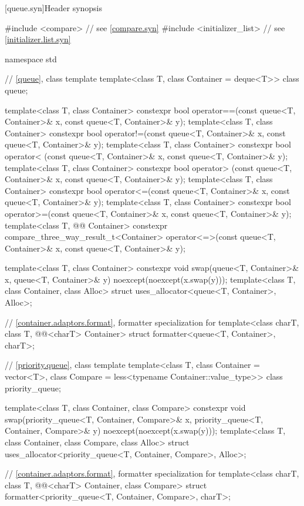 [queue.syn]{Header  synopsis}

\begin{codeblock}
#include <compare>              // see \ref{compare.syn}
#include <initializer_list>     // see \ref{initializer.list.syn}

namespace std {
  // \ref{queue}, class template 
  template<class T, class Container = deque<T>> class queue;

  template<class T, class Container>
    constexpr bool operator==(const queue<T, Container>& x, const queue<T, Container>& y);
  template<class T, class Container>
    constexpr bool operator!=(const queue<T, Container>& x, const queue<T, Container>& y);
  template<class T, class Container>
    constexpr bool operator< (const queue<T, Container>& x, const queue<T, Container>& y);
  template<class T, class Container>
    constexpr bool operator> (const queue<T, Container>& x, const queue<T, Container>& y);
  template<class T, class Container>
    constexpr bool operator<=(const queue<T, Container>& x, const queue<T, Container>& y);
  template<class T, class Container>
    constexpr bool operator>=(const queue<T, Container>& x, const queue<T, Container>& y);
  template<class T, @@ Container>
    constexpr compare_three_way_result_t<Container>
      operator<=>(const queue<T, Container>& x, const queue<T, Container>& y);

  template<class T, class Container>
    constexpr void swap(queue<T, Container>& x, queue<T, Container>& y)
      noexcept(noexcept(x.swap(y)));
  template<class T, class Container, class Alloc>
    struct uses_allocator<queue<T, Container>, Alloc>;

  // \ref{container.adaptors.format}, formatter specialization for 
  template<class charT, class T, @@<charT> Container>
    struct formatter<queue<T, Container>, charT>;

  // \ref{priority.queue}, class template 
  template<class T, class Container = vector<T>,
           class Compare = less<typename Container::value_type>>
    class priority_queue;

  template<class T, class Container, class Compare>
    constexpr void swap(priority_queue<T, Container, Compare>& x,
                        priority_queue<T, Container, Compare>& y) noexcept(noexcept(x.swap(y)));
  template<class T, class Container, class Compare, class Alloc>
    struct uses_allocator<priority_queue<T, Container, Compare>, Alloc>;

  // \ref{container.adaptors.format}, formatter specialization for 
  template<class charT, class T, @@<charT> Container, class Compare>
    struct formatter<priority_queue<T, Container, Compare>, charT>;
}
\end{codeblock}

